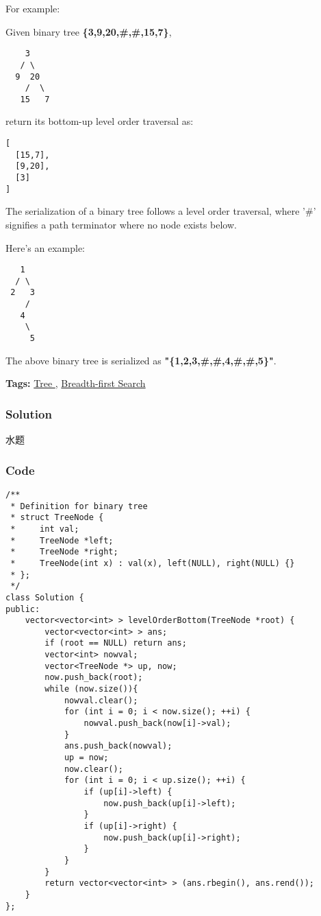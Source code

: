 \documentclass{article}
\begin{document}
\begin{CJK*}{UTF8}{gkai}
For example:


Given binary tree \textbf{\{3,9,20,\#,\#,15,7\}},


\begin{verbatim}
    3
   / \
  9  20
    /  \
   15   7
\end{verbatim}

return its bottom-up level order traversal as:


\begin{verbatim}
[
  [15,7],
  [9,20],
  [3]
]
\end{verbatim}

The serialization of a binary tree follows a level order traversal, where '\#' signifies a path terminator where no node exists below.

Here's an example:


\begin{verbatim}
   1
  / \
 2   3
    /
   4
    \
     5
\end{verbatim}
The above binary tree is serialized as \textbf{"\{1,2,3,\#,\#,4,\#,\#,5\}"}.


\textbf{Tags: }
\hyperref[ Tree ]{ Tree },  \hyperref[ Breadth-first Search ]{ Breadth-first Search }



\subsubsection*{Solution}
水题

\subsubsection*{Code}
\begin{lstlisting}
/**
 * Definition for binary tree
 * struct TreeNode {
 *     int val;
 *     TreeNode *left;
 *     TreeNode *right;
 *     TreeNode(int x) : val(x), left(NULL), right(NULL) {}
 * };
 */
class Solution {
public:
    vector<vector<int> > levelOrderBottom(TreeNode *root) {
        vector<vector<int> > ans;
        if (root == NULL) return ans;
        vector<int> nowval;
        vector<TreeNode *> up, now;
        now.push_back(root);
        while (now.size()){
            nowval.clear();
            for (int i = 0; i < now.size(); ++i) {
                nowval.push_back(now[i]->val);
            }
            ans.push_back(nowval);
            up = now;
            now.clear();
            for (int i = 0; i < up.size(); ++i) {
                if (up[i]->left) {
                    now.push_back(up[i]->left);
                }
                if (up[i]->right) {
                    now.push_back(up[i]->right);
                }
            }
        }
        return vector<vector<int> > (ans.rbegin(), ans.rend());
    }
}; 
\end{lstlisting}



\end{CJK*}
\end{document}
